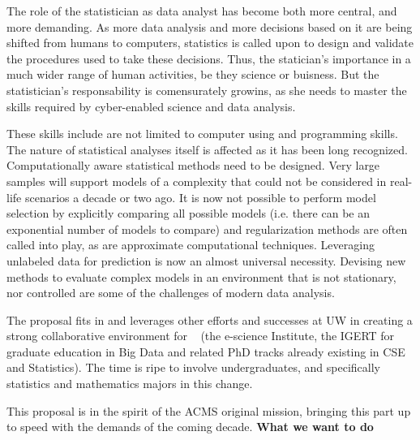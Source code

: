\item {} The role of
  the statistician as data analyst has become both more central, and
  more demanding. As more data analysis and more decisions based on it
  are being shifted from humans to computers, statistics is called
  upon to design and validate the procedures used to take these
  decisions. Thus, the statician's importance in a much wider range of
  human activities, be they science or buisness. But the
  statistician's responsability is comensurately growins, as she needs
  to master the skills required by cyber-enabled science and data
  analysis.
\item These skills include are not limited to computer using and
  programming skills. The nature of statistical analyses itself is
  affected  as it has been long
  recognized. Computationally aware statistical methods need to be
  designed. Very large samples will support models of a complexity
  that could not be considered in real-life scenarios a decade or two
  ago. It is now not possible to perform model selection by explicitly
  comparing all possible models (i.e. there can be an exponential
  number of models to compare) and regularization methods are often
  called into play, as are approximate computational
  techniques. Leveraging unlabeled data for prediction is now an
  almost universal necessity. Devising new methods to evaluate complex
  models in an environment that is not stationary, nor controlled are
  some of the challenges of modern data analysis.
\item The proposal fits in and leverages other efforts and successes at UW in creating a strong collaborative environment for \cdse~ (the e-science Institute, the IGERT for graduate education in Big Data and related PhD tracks already existing in CSE and Statistics). The time is ripe to involve undergraduates, and specifically statistics and mathematics majors in this change.
\item This proposal is in the spirit of the ACMS original mission,
  bringing this part up to speed with the demands of the coming decade.
\eit
{\bf What we want to do}

